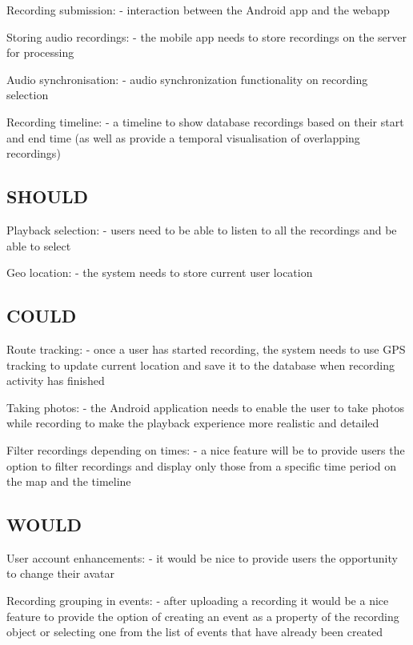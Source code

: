 \documentclass{l3proj}
\begin{document}
		Recording submission:
			- interaction between the Android app and the webapp

		Storing audio recordings:
			- the mobile app needs to store recordings on the server for processing

		Audio synchronisation:
			- audio synchronization functionality on recording selection

		Recording timeline:
			- a timeline to show database recordings based on their start and end time (as well as provide a temporal visualisation of overlapping recordings)

	\subsection{SHOULD}

		Playback selection:
			- users need to be able to listen to all the recordings and be able to select 

		Geo location:
			- the system needs to store current user location


	\subsection{COULD}

		Route tracking:
			- once a user has started recording, the system needs to use GPS tracking to update current location and save it to the database when recording activity has finished

		Taking photos:
			- the Android application needs to enable the user to take photos while recording to make the playback experience more realistic and detailed

		Filter recordings depending on times:
			- a nice feature will be to provide users the option to filter recordings and display only those from a specific time period on the map and the timeline

	\subsection{WOULD}

		User account enhancements:
			- it would be nice to provide users the opportunity to change their avatar

		Recording grouping in events:
			- after uploading a recording it would be a nice feature to provide the option of creating an event as a property of the recording object or selecting one from the list of events that have already been created
\end{document}
